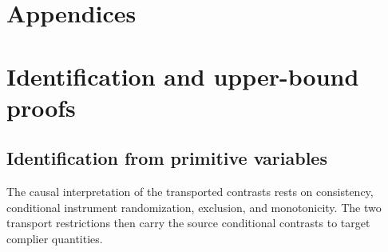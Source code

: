 \documentclass[11pt]{article}
\begin{document}
\appendix

\section*{Appendices}

\section{Identification and upper-bound proofs}
\label{sec:upper-appendix}

\subsection{Identification from primitive variables}

The causal interpretation of the transported contrasts rests on consistency, conditional instrument randomization, exclusion, and monotonicity. The two transport restrictions then carry the source conditional contrasts to target complier quantities.
\end{document}
